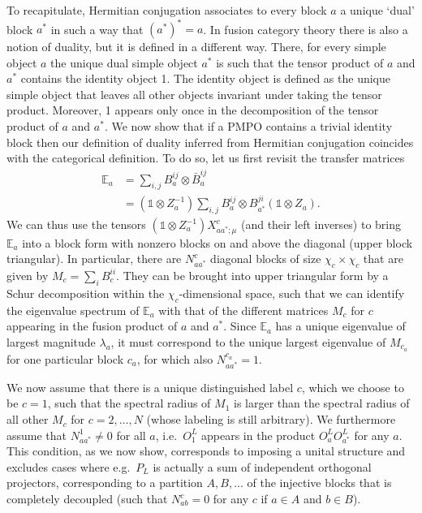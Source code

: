 \documentclass[12 pt]{article}
\begin{document}
To recapitulate, Hermitian conjugation associates to every block $a$ a unique `dual' block $a^*$ in such a way that $(a^*)^ * = a$. In fusion category theory there is also a notion of duality, but it is defined in a different way. There, for every simple object $a$ the unique dual simple object $a^*$ is such that the tensor product of $a$ and $a^ *$ contains the identity object 1. The identity object is defined as the unique simple object that leaves all other objects invariant under taking the tensor product. Moreover, 1 appears only once in the decomposition of the tensor product of $a$ and $a^*$. We now show that if a PMPO contains a trivial identity block then our definition of duality inferred from Hermitian conjugation coincides with the categorical definition. To do so, let us first revisit the transfer matrices
\begin{align*}
\mathbb{E}_{a} &= \sum_{i,j} B^{ij}_a \otimes \bar{B}^{ij}_a \\
&= (\mathds{1}\otimes Z_{a}^{-1}) \sum_{i,j} B^{ij}_a \otimes B^{ji}_{a^*} (\mathds{1}\otimes Z_{a}).
\end{align*}
We can thus use the tensors $(\mathds{1}\otimes Z_{a}^{-1}) X_{aa^*;\mu}^{c}$ (and their left inverses) to bring $\mathbb{E}_{a}$ into a block form with nonzero blocks on and above the diagonal (upper block triangular). In particular, there are $N_{aa^*}^{c}$ diagonal blocks of size $\chi_c\times \chi_c$ that are given by $M_{c}=\sum_{i} B^{ii}_{c}$. They can be brought into upper triangular form by a Schur decomposition within the $\chi_c$-dimensional space, such that we can identify the eigenvalue spectrum of $\mathbb{E}_{a}$ with that of the different matrices $M_c$ for $c$ appearing in the fusion product of $a$ and $a^*$. Since $\mathbb{E}_{a}$ has a unique eigenvalue of largest magnitude $\lambda_a$, it must correspond to the unique largest eigenvalue of $M_{c_{a}}$ for one particular block $c_{a}$, for which also $N_{aa^*}^{c_a}=1$.

We now assume that there is a unique distinguished label $c$, which we choose to be $c=1$, such that the spectral radius of $M_{1}$ is larger than the spectral radius of all other $M_{c}$ for $c=2,\ldots,N$ (whose labeling is still arbitrary). We furthermore assume that $N_{aa^*}^{1}\neq 0$ for all $a$, i.e.\ $O_1^L$ appears in the product $O_a^L O_{a^*}^L$ for any $a$. This condition, as we now show, corresponds to imposing a unital structure and excludes cases where e.g.\ $P_L$ is actually a sum of independent orthogonal projectors, corresponding to a partition $A,B,...$ of the injective blocks that is completely decoupled (such that $N_{ab}^{c}=0$ for any $c$ if $a\in A$ and $b\in B$).
\end{document}
